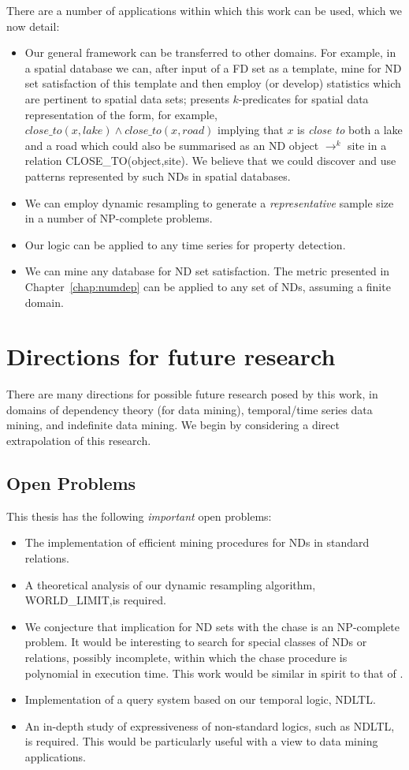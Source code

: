 There are a number of applications within which this work can be
used, which we now detail:
\begin{itemize}
\item Our general framework can be transferred to other domains. For
example, in a spatial database we can, after input of a FD set as a
template, mine for ND set satisfaction of this template and
then employ (or develop) statistics which are pertinent to spatial
data sets; \cite{kah96} presents $k$-predicates for spatial data
representation of the form, for example, $close\_to(x,lake) \wedge
close\_to(x,road)$ implying that $x$ is {\em close to} both a lake and a
road which could also be summarised as an ND object $\to^k$ site in a
relation CLOSE\_TO(object,site).  We believe that we could discover
and use patterns represented
by such NDs in spatial databases.
\item We can employ dynamic resampling to generate a {\em
representative} sample size in a number of NP-complete problems. 
\item Our logic can be applied to any time series for property
detection. 
\item We can mine any database for ND set satisfaction. The metric
presented in Chapter~\ref{chap:numdep} can be applied to any set of
NDs, assuming a finite domain.
\end{itemize}

\section{Directions for future research}

There are many directions for possible future research posed by this
work, in domains of dependency theory (for data mining), temporal/time
series data mining, and indefinite data mining. We begin by
considering a direct extrapolation of this research.
 
\subsection{Open Problems}

This thesis has the following {\em important} open problems:
\begin{itemize}
\item The implementation of efficient mining procedures for NDs in
standard relations.
\item A theoretical analysis of our dynamic resampling
algorithm, WORLD\_LIMIT,is required.
\item We conjecture that
implication for ND sets with the chase is an NP-complete problem. It would be
interesting to search for special classes of NDs or relations,
possibly incomplete, within
which the chase procedure is polynomial in execution time. This work
would be similar in spirit to that of \cite{ll97c}.
\item Implementation of a query system based on our temporal logic,
NDLTL.
\item An in-depth study of expressiveness of non-standard logics, such
as NDLTL, is required. This would be particularly useful with a view to
data mining applications.
\end{itemize}

